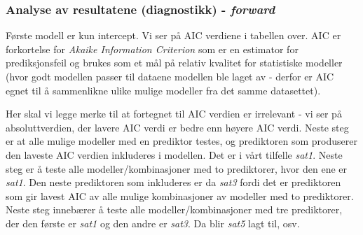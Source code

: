 \documentclass[
]{article}
\newenvironment{Shaded}{\begin{snugshade}}{\end{snugshade}}
\newcommand{\CommentTok}[1]{\textcolor[rgb]{0.56,0.35,0.01}{\textit{#1}}}
\newcommand{\NormalTok}[1]{#1}
\newcommand{\SpecialCharTok}[1]{\textcolor[rgb]{0.00,0.00,0.00}{#1}}
\begin{document}
\hypertarget{analyse-av-resultatene-diagnostikk---forward}{%
\subsubsection{\texorpdfstring{Analyse av resultatene (diagnostikk) - \emph{forward}}{Analyse av resultatene (diagnostikk) - forward}}\label{analyse-av-resultatene-diagnostikk---forward}}

\begin{Shaded}
\end{Shaded}

Første modell er kun intercept. Vi ser på AIC verdiene i tabellen over. AIC er forkortelse for \emph{Akaike Information Criterion} som er en estimator for prediksjonsfeil og brukes som et mål på relativ kvalitet for statistiske modeller (hvor godt modellen passer til dataene modellen ble laget av - derfor er AIC egnet til å sammenlikne ulike mulige modeller fra det samme datasettet).

Her skal vi legge merke til at fortegnet til AIC verdien er irrelevant - vi ser på absoluttverdien, der lavere AIC verdi er bedre enn høyere AIC verdi.
Neste steg er at alle mulige modeller med en prediktor testes, og prediktoren som produserer den laveste AIC verdien inkluderes i modellen. Det er i vårt tilfelle \emph{sat1}. Neste steg er å teste alle modeller/kombinasjoner med to prediktorer, hvor den ene er \emph{sat1}. Den neste prediktoren som inkluderes er da \emph{sat3} fordi det er prediktoren som gir lavest AIC av alle mulige kombinasjoner av modeller med to prediktorer. Neste steg innebærer å teste alle modeller/kombinasjoner med tre prediktorer, der den første er \emph{sat1} og den andre er \emph{sat3}. Da blir \emph{sat5} lagt til, osv.
\end{document}
